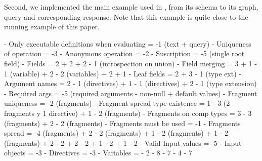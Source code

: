 

Second, we implemented the main example used in \HP, from its schema to its graph, query and corresponding response. Note that this example is quite close to the running example of this paper.


\iffalse
	-	Only executable definitions when evaluating = -1 (text + query)
	- Uniqueness of operation = -3
	- Anonymous operation = -2
	- Suscription = -5 (single root field)
	- Fields = 2 + 2 + 2 - 1 (introspection on union)
	- Field merging = 3 + 1 - 1 (variable) + 2 - 2  (variables) + 2  + 1
	- Leaf fields = 2 + 3 - 1 (type ext)
	- Argument names = 2 - 1 (directives) + 1 - 1 (directives) + 2  - 1 (type extension)
	- Required args = -5 (required arguments - non-null + default values)
	- Fragment uniqueness = -2 (fragments)
	- Fragment spread type existence = 1 - 3 (2 fragments y 1 directive) + 1 - 2 (fragments)
	- Fragments on comp types = 3 - 3 (fragments) + 2 - 2 (fragments)
	- Fragments must be used = -1
	- Fragments spread = -4 (fragments) + 2 - 2 (fragments) + 1 - 2 (fragments) + 1 - 2 (fragments) + 2 - 2  + 2 - 2 + 1 - 2 + 1 - 2 
	- Valid Input values = -5
	- Input objects = -3
	- Directives = -3
	- Variables = - 2 - 8 - 7 - 4 - 7
	
